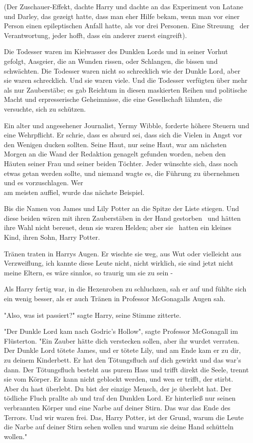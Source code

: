 {(Der Zuschauer-Effekt, dachte Harry und dachte an das Experiment von Latane und Darley, das gezeigt hatte, dass man eher Hilfe bekam, wenn man vor einer Person einen epileptischen Anfall hatte, als vor drei Personen. Eine Streuung ~der Verantwortung, jeder hofft, dass ein anderer zuerst eingreift).

Die Todesser waren im Kielwasser des Dunklen Lords und in seiner Vorhut gefolgt, Aasgeier, die an Wunden rissen, oder Schlangen, die bissen und schwächten. Die Todesser waren nicht so schrecklich wie der Dunkle Lord, aber sie waren schrecklich. Und sie waren viele. Und die Todesser verfügten über mehr als nur Zauberstäbe; es gab Reichtum in diesen maskierten Reihen und politische Macht und erpresserische Geheimnisse, die eine Gesellschaft lähmten, die versuchte, sich zu schützen.

Ein alter und angesehener Journalist, Yermy Wibble, forderte höhere Steuern und eine Wehrpflicht. Er schrie, dass es absurd sei, dass sich die Vielen in Angst vor den Wenigen ducken sollten. Seine Haut, nur seine Haut, war am nächsten Morgen an die Wand der Redaktion genagelt gefunden worden, neben den Häuten seiner Frau und seiner beiden Töchter. Jeder wünschte sich, dass noch etwas getan werden sollte, und niemand wagte es, die Führung zu übernehmen und es vorzuschlagen. Wer\\ am meisten auffiel, wurde das nächste Beispiel.

Bis die Namen von James und Lily Potter an die Spitze der Liste stiegen. Und diese beiden wären mit ihren Zauberstäben in der Hand gestorben ~und hätten ihre Wahl nicht bereuet, denn sie waren Helden; aber sie ~hatten ein kleines Kind, ihren Sohn, Harry Potter.

Tränen traten in Harrys Augen. Er wischte sie weg, aus Wut oder vielleicht aus Verzweiflung, ich kannte diese Leute nicht, nicht wirklich, sie sind jetzt nicht meine Eltern, es wäre sinnlos, so traurig um sie zu sein -

Als Harry fertig war, in die Hexenroben zu schluchzen, sah er auf und fühlte sich ein wenig besser, als er auch Tränen in Professor McGonagalls Augen sah.

"Also, was ist passiert?" sagte Harry, seine Stimme zitterte.

"Der Dunkle Lord kam nach Godric's Hollow", sagte Professor McGonagall im Flüsterton. "Ein Zauber hätte dich verstecken sollen, aber ihr wurdet verraten. Der Dunkle Lord tötete James, und er tötete Lily, und am Ende kam er zu dir, zu deinem Kinderbett. Er hat den Tötungsfluch auf dich gewirkt und das war's dann. Der Tötungsfluch besteht aus purem Hass und trifft direkt die Seele, trennt sie vom Körper. Er kann nicht geblockt werden, und wen er trifft, der stirbt. Aber du hast überlebt. Du bist der einzige Mensch, der je überlebt hat. Der tödliche Fluch prallte ab und traf den Dunklen Lord. Er hinterließ nur seinen verbrannten Körper und eine Narbe auf deiner Stirn. Das war das Ende des Terrors. Und wir waren frei. Das, Harry Potter, ist der Grund, warum die Leute die Narbe auf deiner Stirn sehen wollen und warum sie deine Hand schütteln wollen."

}
